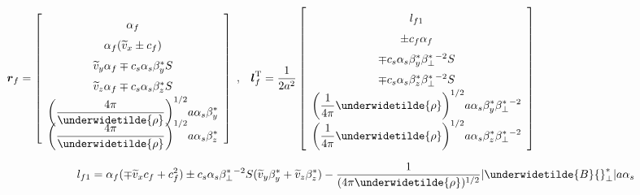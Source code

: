 \begin{center}
$\renewcommand{\arraystretch}{1.5}
\mbox{\boldmath $r$}_{f} =
\left[
\begin{array}{c}
\alpha_{f} \\
\alpha_{f} ( \widetilde{v}_{x} \pm c_{f} ) \\
\widetilde{v}_{y} \alpha_{f} \mp c_{s} \alpha_{s} \beta^{\ast}_{y} S  \\
\widetilde{v}_{z} \alpha_{f} \mp c_{s} \alpha_{s} \beta^{\ast}_{z} S  \\
\displaystyle
\biggl( \frac{4 \pi}{\underwidetilde{\rho}} \biggr)^{1/2}
a \alpha_{s} \beta^{\ast}_{y} \vspace{-6pt} \\
\displaystyle
\biggl( \frac{4 \pi}{\underwidetilde{\rho}} \biggr)^{1/2}
a \alpha_{s} \beta^{\ast}_{z} \vspace{-6pt} \\
\end{array}
\right]$ , $\;$
$\renewcommand{\arraystretch}{1.5}
\displaystyle
\mbox{\boldmath $l$}_{f}^{\rm T} =
\frac{1}{2 a^2}
\left[
\begin{array}{c}
l_{f1} \\
\pm c_f \alpha_f \\
\mp c_{s} \alpha_{s}
\beta^{\ast}_{y} \beta^{\ast}_{\bot} {}^{-2} S \\
\mp c_{s} \alpha_{s}
\beta^{\ast}_{z} \beta^{\ast}_{\bot} {}^{-2} S \\
\displaystyle
\biggl( \frac1{4 \pi} {\underwidetilde{\rho}} \biggr)^{1/2}
a \alpha_{s} \beta_y^{\ast}
\beta^{\ast}_{\bot} {}^{-2} \\
\displaystyle
\biggl( \frac1{4 \pi} {\underwidetilde{\rho}} \biggr)^{1/2}
a \alpha_{s} \beta_z^{\ast}
\beta^{\ast}_{\bot} {}^{-2} \\
\end{array}
\right]$ 
\end{center}

\begin{center}
\begin{equation}
\displaystyle
l_{f1} = \alpha_{f} ( 
\mp \widetilde{v}_{x} c_{f} + c_{f}^2 )
 \pm c_{s} \alpha_{s} \beta^{\ast}_{\bot} {}^{-2} S 
(\widetilde{v}_{y} \beta_{y}^{\ast} + \widetilde{v}_{z} \beta_{z}^{\ast})
- \frac1{(4 \pi \underwidetilde{\rho})^{1/2}} 
| \underwidetilde{B} {}^{\ast}_{\bot} | a \alpha_{s} \nonumber
\end{equation}
\end{center}

